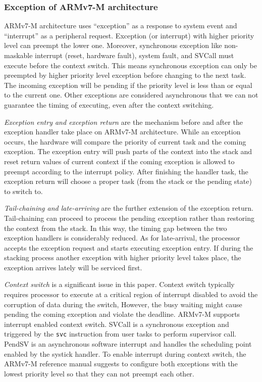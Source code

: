 \subsubsection{Exception of ARMv7-M architecture}
ARMv7-M architecture \cite{ARMv7-M:Manual, Yiu:2013:DGA:2602039} uses ``exception'' as a response to system event and ``interrupt'' as a peripheral request. Exception (or interrupt) with higher priority level can preempt the lower one. Moreover, synchronous exception like non-maskable interrupt (reset, hardware fault), system fault, and SVCall must execute before the context switch. This means synchronous exception can only be preempted by higher priority level exception before changing to the next task. The incoming exception will be pending if the priority level is less than or equal to the current one. Other exceptions are considered asynchronous that we can not guarantee the timing of executing, even after the context switching.

\textit{Exception entry and exception return} are the mechanism before and after the exception handler take place on ARMv7-M architecture. While an exception occurs, the hardware will compare the priority of current task and the coming exception. The exception entry will push parts of the context into the stack and reset return values of current context if the coming exception is allowed to preempt according to the interrupt policy. After finishing the handler task, the exception return will choose a proper task (from the stack or the pending state) to switch to.

\textit{Tail-chaining and late-arriving} are the further extension of the exception return. Tail-chaining can proceed to process the pending exception rather than restoring the context from the stack. In this way, the timing gap between the two exception handlers is considerably reduced. As for late-arrival, the processor accepts the exception request and starts executing exception entry. If during the stacking process another exception with higher priority level takes place, the exception arrives lately will be serviced first.

\textit{Context switch} is a significant issue in this paper. Context switch typically requires processor to execute at a critical region of interrupt disabled to avoid the corruption of data during the switch, However, the busy waiting might cause pending the coming exception and violate the deadline. ARMv7-M supports interrupt enabled context switch. SVCall is a synchronous exception and triggered by the \texttt{svc} instruction from user tasks to perform supervisor call. PendSV is an asynchronous software interrupt and handles the scheduling point enabled by the systick handler. To enable interrupt during context switch, the ARMv7-M reference manual suggests to configure both exceptions with the lowest priority level so that they can not preempt each other.

